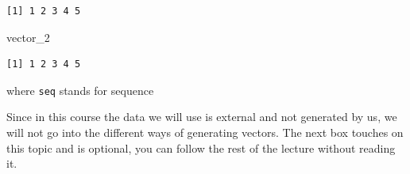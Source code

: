 \documentclass[
  letterpaper,
  DIV=11,
  numbers=noendperiod]{scrartcl}
\newenvironment{Shaded}{\begin{snugshade}}{\end{snugshade}}
\newcommand{\NormalTok}[1]{\textcolor[rgb]{0.00,0.23,0.31}{#1}}
\begin{document}
\begin{verbatim}
[1] 1 2 3 4 5
\end{verbatim}

\begin{Shaded}
\begin{Highlighting}[]
\NormalTok{vector\_2}
\end{Highlighting}
\end{Shaded}

\begin{verbatim}
[1] 1 2 3 4 5
\end{verbatim}

where \texttt{seq} stands for sequence

Since in this course the data we will use is external and not generated
by us, we will not go into the different ways of generating vectors. The
next box touches on this topic and is optional, you can follow the rest
of the lecture without reading it.
\end{document}

